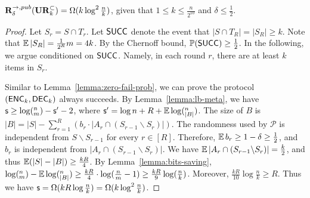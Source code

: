 \begin{theorem}\label{thm:urk}
  $\mathbf{R}^{\rightarrow,pub}_\delta(\mathbf{UR}_k^\subset) = \Omega(k\log^2 \frac{n}{k} )$, given that $1 \le k \le \frac{n}{2^{10}}$ and $\delta \le \frac{1}{2}$.
\end{theorem}
\begin{proof}
Let $S_r=S\cap T_r$.  Let $\textsf{SUCC}$ denote the event that $|S\cap T_R|=|S_R|\ge k$.  Note that $\operatorname*{\mathbb{E}}|S_R|=\frac{1}{2^R}m=4k$. By the Chernoff bound, $\operatorname*{\mathbb{P}}(\textsf{SUCC})\ge \frac{1}{2}$.  In the following, we argue conditioned on $\textsf{SUCC}$. Namely, in each round $r$, there are at least $k$ items in $S_r$.
  
Similar to Lemma~\ref{lemma:zero-fail-prob}, we can prove the protocol $(\textsf{ENC}_k,\textsf{DEC}_k)$ always succeeds.  By Lemma~\ref{lemma:lb-meta}, we have $\textsf{s}\ge \log (^n_m) - \textsf{s}' -2$, where $\textsf{s}'=\log n + R+ \operatorname*{\mathbb{E}} \log (^n_{|B|})$.  The size of $B$ is $|B|=|S|-\sum_{r=1}^{R}{(b_r \cdot |A_r \cap (S_{r-1}\backslash S_r)|)}$.  The randomness used by $\mathcal{P}$ is independent from $S\backslash S_{r-1}$ for every $r\in[R]$.  Therefore, $\operatorname*{\mathbb{E}} b_r\ge 1-\delta\ge \frac{1}{2}$, and $b_r$ is independent from $|A_r \cap (S_{r-1}\backslash S_r)|$.  We have $\operatorname*{\mathbb{E}}|A_r \cap (S_{r-1}\backslash S_r)|=\frac{k}{2}$, and thus $\operatorname*{\mathbb{E}}(|S|-|B|)\ge \frac{kR}{4}$.  By Lemma~\ref{lemma:bits-saving}, $\log (^n_m)-\operatorname*{\mathbb{E}}\log (^n_{|B|})\ge \frac{kR}{4}\cdot \log (\frac{n}{m}-1) \ge \frac{kR}{9}\log (\frac{n}{k})$.  Moreover, $\frac{kR}{10}\log \frac{n}{k}\ge R$.  Thus we have $\textsf{s} = \Omega(kR\log\frac{n}{k}) = \Omega(k\log^2 \frac{n}{k} )$.
\end{proof}
